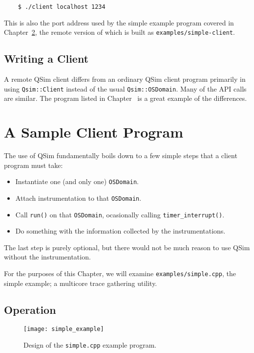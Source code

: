 \documentclass[letterpaper, 10pt]{book}
\begin{document}
\begin{verbatim}
    $ ./client localhost 1234
\end{verbatim}

This is also the port address used by the simple example program covered in
Chapter~\ref{chap:example}, the remote version of which is built as 
\texttt{examples/simple-client}.

\section{Writing a Client}

A remote QSim client differs from an ordinary QSim client program primarily in
using \texttt{Qsim::Client} instead of the usual \texttt{Qsim::OSDomain}. Many
of the API calls are similar. The program listed in Chapter~\label{chap:example}
is a great example of the differences.

\chapter{A Sample Client Program} \label{chap:example}
The use of QSim fundamentally boils down to a few simple steps that a client
program must take:
\begin{itemize}
  \item{Instantiate one (and only one) \texttt{OSDomain}.}
  \item{Attach instrumentation to that \texttt{OSDomain}.}
  \item{Call \texttt{run()} on that \texttt{OSDomain}, ocasionally calling
        \texttt{timer\_interrupt()}.} 
  \item{Do something with the information collected by the instrumentations.}
\end{itemize}

The last step is purely optional, but there would not be much reason to use
QSim without the instrumentation.

For the purposes of this Chapter, we will examine \texttt{examples/simple.cpp},
the simple example; a multicore trace gathering utility.

\section{Operation}

\begin{figure}
\begin{center}
\texttt{[image: simple\_example]}
\caption{Design of the \texttt{simple.cpp} example program.}
\label{fig:simplecpp}
\end{center}
\end{figure}
\end{document}
